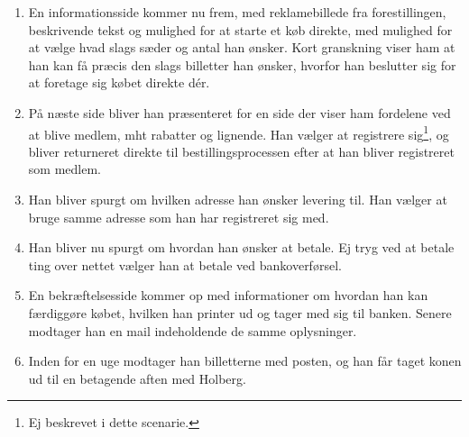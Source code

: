 \begin{enumerate}
{    }
    \item {
        En informationsside kommer nu frem, med reklamebillede fra forestillingen, beskrivende tekst og mulighed for at starte et køb direkte, med mulighed for at vælge hvad slags sæder og antal han ønsker. Kort granskning viser ham at han kan få præcis den slags billetter han ønsker, hvorfor han beslutter sig for at foretage sig købet direkte dér.
    }
    \item {
        På næste side bliver han præsenteret for en side der viser ham fordelene ved at blive medlem, mht rabatter og lignende. Han vælger at registrere sig\footnote{Ej beskrevet i dette scenarie.}, og bliver returneret direkte til bestillingsprocessen efter at han bliver registreret som medlem.
    }
    \item {
        Han bliver spurgt om hvilken adresse han ønsker levering til. Han vælger at bruge samme adresse som han har registreret sig med.
    }
    \item {
        Han bliver nu spurgt om hvordan han ønsker at betale. Ej tryg ved at betale ting over nettet vælger han at betale ved bankoverførsel.
    }
    \item {
        En bekræftelsesside kommer op med informationer om hvordan han kan færdiggøre købet, hvilken han printer ud og tager med sig til banken. Senere modtager han en mail indeholdende de samme oplysninger.
    }
    \item {
        Inden for en uge modtager han billetterne med posten, og han får taget konen ud til en betagende aften med Holberg.
    }
\end{enumerate}
